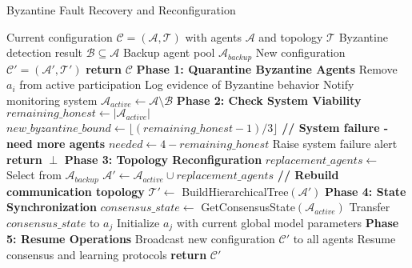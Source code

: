 \begin{algorithm}[htbp]
\caption{Byzantine Fault Recovery and Reconfiguration}
\label{alg:fault_recovery}
\begin{algorithmic}[1]
\REQUIRE Current configuration $\mathcal{C} = (\mathcal{A}, \mathcal{T})$ with agents $\mathcal{A}$ and topology $\mathcal{T}$
\REQUIRE Byzantine detection result $\mathcal{B} \subseteq \mathcal{A}$
\REQUIRE Backup agent pool $\mathcal{A}_{backup}$
\ENSURE New configuration $\mathcal{C}' = (\mathcal{A}', \mathcal{T}')$
    \STATE \textbf{return} $\mathcal{C}$ 
\ENDIF
\STATE \textbf{Phase 1: Quarantine Byzantine Agents}
    \STATE Remove $a_i$ from active participation
    \STATE Log evidence of Byzantine behavior
    \STATE Notify monitoring system
\ENDFOR
\STATE $\mathcal{A}_{active} \gets \mathcal{A} \setminus \mathcal{B}$
\STATE \textbf{Phase 2: Check System Viability}
\STATE $remaining\_honest \gets |\mathcal{A}_{active}|$
\STATE $new\_byzantine\_bound \gets \lfloor (remaining\_honest - 1)/3 \rfloor$
 
    \STATE \textbf{// System failure - need more agents}
    \STATE $needed \gets 4 - remaining\_honest$
        \STATE Raise system failure alert
        \STATE \textbf{return} $\perp$
    \ENDIF
\ENDIF
\STATE \textbf{Phase 3: Topology Reconfiguration}
\STATE $replacement\_agents \gets$ Select from $\mathcal{A}_{backup}$
\STATE $\mathcal{A}' \gets \mathcal{A}_{active} \cup replacement\_agents$
\STATE \textbf{// Rebuild communication topology}
\STATE $\mathcal{T}' \gets$ BuildHierarchicalTree$(\mathcal{A}')$
\STATE \textbf{Phase 4: State Synchronization}
    \STATE $consensus\_state \gets$ GetConsensusState$(\mathcal{A}_{active})$
    \STATE Transfer $consensus\_state$ to $a_j$
    \STATE Initialize $a_j$ with current global model parameters
\ENDFOR
\STATE \textbf{Phase 5: Resume Operations}
\STATE Broadcast new configuration $\mathcal{C}'$ to all agents
\STATE Resume consensus and learning protocols
\STATE \textbf{return} $\mathcal{C}'$
\end{algorithmic}
\end{algorithm}
